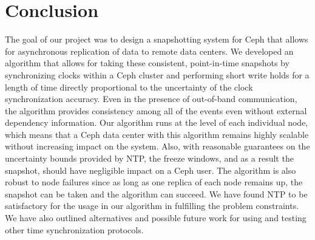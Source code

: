 \chapter{Conclusion}
\label{sec:conclusion}

The goal of our project was to design a snapshotting system for Ceph 
that allows for asynchronous replication of data to remote data centers.
We developed an algorithm that allows for taking these consistent, 
point-in-time snapshots by synchronizing clocks within a Ceph cluster
and performing short write holds for a length of time directly 
proportional to the uncertainty of the clock synchronization accuracy.
Even in the presence of out-of-band communication, the algorithm provides
consistency among all of the events even without external dependency
information. Our algorithm runs at the level of each individual node,
which means that a Ceph data center with this algorithm remains highly
scalable without increasing impact on the system. Also, with
reasonable guarantees on the uncertainty bounds provided by NTP, the
freeze windows, and as a result the snapshot, should have negligible
impact on a Ceph user. The algorithm is also robust to node failures
since as long as one replica of each node remains up, the snapshot can be
taken and the algorithm can succeed. We have found NTP to be
satisfactory for the usage in our algorithm in fulfilling the problem
constraints. We have also outlined alternatives and possible
future work for using and testing other time synchronization
protocols.
